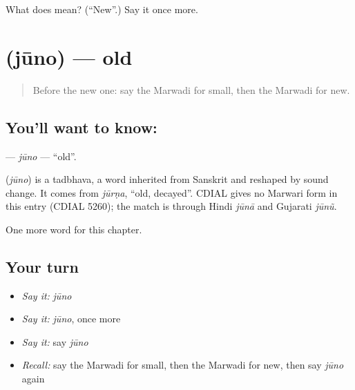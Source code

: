 \begin{tcolorbox}[breakable,colback=teal!4,colframe=teal!35!black,title={Before you move on}]
What does  mean? (\textquotedblleft{}New\textquotedblright{}.) Say it once more.
\end{tcolorbox}
\section[\texorpdfstring{\mw{जूनो} (jūno)}{जूनो (jūno)}]{ (jūno) — old}

\label{lesson:MW-C73-juno}



\begin{quote}
Before the new one: say the Marwadi for small, then the Marwadi for new.
\end{quote}

\subsection*{You'll want to know: }
\textbf{} — \emph{jūno} — \textquotedblleft{}old\textquotedblright{}.

\begin{cousinweb}
\textbf{} (\emph{jūno}) is a tadbhava, a word inherited from Sanskrit and reshaped by sound change. It comes from \emph{jūrṇa}, \textquotedblleft{}old, decayed\textquotedblright{}. CDIAL gives no Marwari form in this entry (CDIAL 5260); the match is through Hindi \emph{jūnā} and Gujarati \emph{jūnũ}.
\end{cousinweb}

\begin{grammarlens}[title={What you've built}]
One more word for this chapter.
\end{grammarlens}

\subsection*{Your turn}
\begin{itemize}
\raggedright
  \item \emph{Say it:} \emph{jūno}
  \item \emph{Say it:} \emph{jūno}, once more
  \item \emph{Say it:} say \emph{jūno}
  \item \emph{Recall:} say the Marwadi for small, then the Marwadi for new, then say \emph{jūno} again
\end{itemize}

